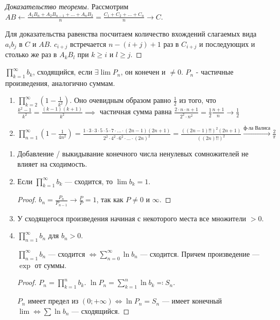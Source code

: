 \begin{proof}[Доказательство теоремы]
    Рассмотрим $AB \leftarrow \frac{A_1 B_n + A_2 B_{n-1} + \ldots + A_nB_2}{n} = \frac{C_1 + C_2 + \ldots + C_n}{n} \to C$.

    Для доказательства равенства посчитаем количество вхождений слагаемых вида $a_i b_j$ в $C$ и $AB$. $c_{i+j}$ встречается $n - (i + j) + 1$ раз в $C_{i+j}$ и последующих и столько же раз в $A_k B_l$ при $k \ge i$ и $l \ge j$.
\end{proof}
\begin{definition}
    $\prod\limits_{k=1}^\infty b_k$, сходящийся, если  $\exists \lim P_n$, он конечен и  $\neq 0$. $P_n$ - частичные произведения, аналогично суммам.
\end{definition}
\begin{example}
    \begin{enumerate}
        \item $\prod\limits_{k=2}^\infty \left(1-\frac{1}{k^2}\right)$. Оно очевидным образом равно $\frac{1}{2}$ из того, что $\frac{k^2 - 1}{k^2} = \frac{(k-1)(k+1)}{k^2} \implies$ частичная сумма равна $\frac{2 \cdot n \cdot n+1}{2^2 \cdot n^2} = \frac{1}{2} \frac{n+1}{n} \to \frac{1}{2}$ 
        \item $\prod_{n=1}^\infty(1 - \frac{1}{4n^2}) = \frac{1 \cdot 3 \cdot 3 \cdot 5 \cdot 5 \cdot 7 \cdot \ldots \cdot (2n-1)(2n+1)}{2^2 \cdot 4^2 \cdot 6^2 \cdot \dots \cdot (2n)^2 } = \frac{((2n-1)!!)^2(2n+1)}{((2n)!!)^2} \xrightarrow{\text{ф-ла Валиса}} \frac{2}{\pi}$
    \end{enumerate}
\end{example}
\begin{properties}
    \begin{enumerate}
        \item Добавление / выкидывание конечного числа ненулевых сомножителей не влияет на сходимость.
        \item Если  $\prod\limits_{k=1}^\infty b_k$ --- сходится, то  $\lim b_k = 1$.
             \begin{proof}
                $b_n = \frac{P_n}{P_{n-1}} \to \frac{P}{P} = 1$, так как $P \neq 0$ и  $\infty$.
            \end{proof}
        \item У сходящегося произведения начиная с некоторого места все множители $>0$. 
        \item  $\prod\limits_{n=1}^\infty b_n$ для  $b_n > 0$. 

             $\prod\limits_{n=1}^\infty b_n$ --- сходится  $\iff \sum\limits_{n = 0}^\infty \ln b_n$ --- сходится. Причем произведение --- $\exp$ от суммы.
\begin{proof}
    $P_n = \prod\limits_{k=1}^n b_k$.  $\ln P_n = \sum\limits_{k=1}^n \ln b_k \eqqcolon S_n$.

     $P_n$ имеет предел из  $(0; +\infty) \iff \ln P_n = S_n$ --- имеет конечный  $\lim \iff \sum \ln b_n$ --- сходящийся.
\end{proof}

    \end{enumerate}
\end{properties}
